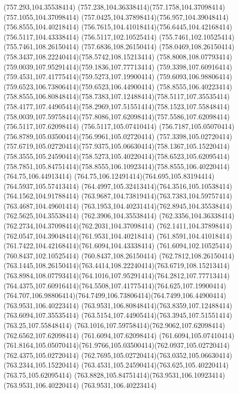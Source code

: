 {{	\lineto(757.293,104.35538414)
	\curveto(757.238,104.36338414)(757.1758,104.37098414)(757.1055,104.37098414)
	\curveto(757.0425,104.37898414)(756.957,104.39048414)(756.8555,104.40218414)
	\curveto(756.7615,104.41018414)(756.6445,104.42168414)(756.5117,104.43338414)
	\lineto(756.5117,102.10525414)
	\lineto(755.7461,102.10525414)
	\lineto(755.7461,108.26150414)
	\lineto(757.6836,108.26150414)
	\curveto(758.0469,108.26150414)(758.3437,108.22240414)(758.5742,108.15213414)
	\curveto(758.8008,108.07793414)(759.0039,107.95291414)(759.1836,107.77713414)
	\curveto(759.3398,107.60916414)(759.4531,107.41775414)(759.5273,107.19900414)
	\curveto(759.6093,106.98806414)(759.6523,106.73806414)(759.6523,106.44900414)
	\closepath
	\moveto(758.8555,106.40223414)
	\curveto(758.8555,106.80848414)(758.7383,107.12488414)(758.5117,107.35535414)
	\curveto(758.4177,107.44905414)(758.2969,107.51551414)(758.1523,107.55848414)
	\curveto(758.0039,107.59758414)(757.8086,107.62098414)(757.5586,107.62098414)
	\lineto(756.5117,107.62098414)
	\lineto(756.5117,105.07410414)
	\curveto(756.7187,105.05070414)(756.8789,105.03500414)(756.9961,105.02720414)
	\lineto(757.3398,105.02720414)
	\curveto(757.6719,105.02720414)(757.9375,105.06630414)(758.1367,105.15220414)
	\curveto(758.3555,105.24590414)(758.5273,105.40220414)(758.6523,105.62095414)
	\curveto(758.7851,105.84751414)(758.8555,106.10923414)(758.8555,106.40220414)
	\closepath
	\moveto(764.75,106.44913414)
	\curveto(764.75,106.12491414)(764.695,105.83194414)(764.5937,105.57413414)
	\curveto(764.4997,105.32413414)(764.3516,105.10538414)(764.1562,104.91788414)
	\curveto(763.9687,104.73819414)(763.7383,104.59757414)(763.4687,104.49601414)
	\curveto(763.1953,104.40231414)(762.8945,104.35538414)(762.5625,104.35538414)
	\lineto(762.3906,104.35538414)
	\curveto(762.3356,104.36338414)(762.2734,104.37098414)(762.2031,104.37098414)
	\curveto(762.1411,104.37898414)(762.0547,104.39048414)(761.9531,104.40218414)
	\curveto(761.8591,104.41018414)(761.7422,104.42168414)(761.6094,104.43338414)
	\lineto(761.6094,102.10525414)
	\lineto(760.8437,102.10525414)
	\lineto(760.8437,108.26150414)
	\lineto(762.7812,108.26150414)
	\curveto(763.1445,108.26150414)(763.4414,108.22240414)(763.6719,108.15213414)
	\curveto(763.8984,108.07793414)(764.1016,107.95291414)(764.2812,107.77713414)
	\curveto(764.4375,107.60916414)(764.5508,107.41775414)(764.625,107.19900414)
	\curveto(764.707,106.98806414)(764.7499,106.73806414)(764.7499,106.44900414)
	\closepath
	\moveto(763.9531,106.40223414)
	\curveto(763.9531,106.80848414)(763.8359,107.12488414)(763.6094,107.35535414)
	\curveto(763.5154,107.44905414)(763.3945,107.51551414)(763.25,107.55848414)
	\curveto(763.1016,107.59758414)(762.9062,107.62098414)(762.6562,107.62098414)
	\lineto(761.6094,107.62098414)
	\lineto(761.6094,105.07410414)
	\curveto(761.8164,105.05070414)(761.9766,105.03500414)(762.0937,105.02720414)
	\lineto(762.4375,105.02720414)
	\curveto(762.7695,105.02720414)(763.0352,105.06630414)(763.2344,105.15220414)
	\curveto(763.4531,105.24590414)(763.625,105.40220414)(763.75,105.62095414)
	\curveto(763.8828,105.84751414)(763.9531,106.10923414)(763.9531,106.40220414)
	\closepath
	\moveto(763.9531,106.40223414)
}
}

